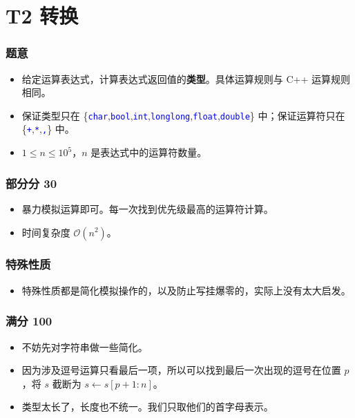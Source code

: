 \documentclass[aspectratio=169]{ctexbeamer}
\begin{document}
\section{T2 转换}


\begin{frame}
  \frametitle{题意}

  \begin{itemize}
    \item <1 - > 给定运算表达式，计算表达式返回值的\textbf{类型}。具体运算规则与 C++ 运算规则相同。
    \item <2 - > 保证类型只在 \{\textcolor{blue}{\texttt{char}},\textcolor{blue}{\texttt{bool}},\textcolor{blue}{\texttt{int}},\textcolor{blue}{\texttt{longlong}},\textcolor{blue}{\texttt{float}},\textcolor{blue}{\texttt{double}}\} 中；保证运算符只在 \{\textcolor{blue}{\texttt{+}},\textcolor{blue}{\texttt{*}},\textcolor{blue}{\texttt{,}}\} 中。
    \item <3 - > $1\leq n\leq 10^5$，$n$ 是表达式中的运算符数量。
  \end{itemize}

\end{frame}

\begin{frame}
  \frametitle{部分分 30}

  \begin{itemize}
    \item <1 - > 暴力模拟运算即可。每一次找到优先级最高的运算符计算。
    \item <2 - > 时间复杂度 $\mathcal O(n^2)$。
  \end{itemize}

\end{frame}

\begin{frame}
  \frametitle{特殊性质}

  \begin{itemize}
    \item <1 - > 特殊性质都是简化模拟操作的，以及防止写挂爆零的，实际上没有太大启发。
  \end{itemize}

\end{frame}

\begin{frame}
  \frametitle{满分 100}

  \begin{itemize}
    \item <1 - > 不妨先对字符串做一些简化。
    \item <2 - > 因为涉及逗号运算只看最后一项，所以可以找到最后一次出现的逗号在位置 $p$，将 $s$ 截断为 $s\gets s[p+1:n]$。
    \item <3 - > 类型太长了，长度也不统一。我们只取他们的首字母表示。
  \end{itemize}

\end{frame}
\end{document}
